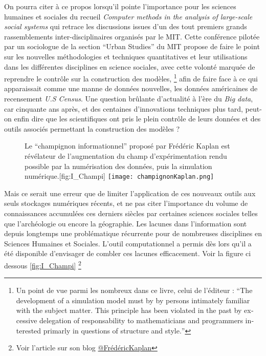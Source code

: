 On pourra citer à ce propos \textcite{Gullahorn1966} lorsqu'il pointe l'importance pour les sciences humaines et sociales du recueil \textit{Computer methods in the analysis of large-scale social systems} qui retrace les discussions issues d'un des tout premiers grands rassemblements inter-disciplinaires organisés par le MIT. Cette conférence pilotée par un sociologue de la section \foreignquote{english}{Urban Studies} du MIT \autocite{Beshers1965} propose de faire le point sur les nouvelles méthodologies et techniques quantitatives et leur utilisations dans les différentes disciplines en science sociales, avec cette volonté marquée de reprendre le contrôle sur la construction des modèles, \footnote{Un point de vue parmi les nombreux dans ce livre, celui de l'éditeur \textcite[194]{Beshers1965} : \foreignquote{english}{The development of a simulation model must by by persons intimately familiar with the subject matter. This principle has been violated in the past by excessive delegation of responsability to mathematicians and programmers interested primarly in questions of structure and style.} } afin de faire face à ce qui apparaissait comme une manne de données nouvelles, les données américaines de recensement \textit{U.S Census}. Une question brûlante d'actualité à l'ère du \textit{Big data}, car cinquante ans après, et des centaines d'innovations techniques plus tard, peut-on enfin dire que les scientifiques ont pris le plein contrôle de leurs données et des outils associés permettant la construction des modèles ?

\begin{figure}[!h]
\begin{sidecaption}[fortoc]{Le \enquote{champignon informationnel} proposé par Frédéric Kaplan est révélateur de l'augmentation du champ d'expérimentation rendu possible par la numérisation des données, puis la simulation numérique.}[fig:I_Champi]
 \centering
 \texttt{[image: champignonKaplan.png]}
  \end{sidecaption}
\end{figure}

Mais ce serait une erreur que de limiter l'application de ces nouveaux outils aux seuls stockages numériques récents, et ne pas citer l'importance du volume de connaissances accumulées ces derniers siècles par certaines sciences sociales telles que l'archéologie ou encore la géographie. Les lacunes dans l'information sont depuis longtemps une problématique récurrente pour de nombreuses disciplines en Sciences Humaines et Sociales. L'outil computationnel a permis dès lors qu'il a été disponible d'envisager de combler ces lacunes efficacement. Voir la figure ci dessous \ref{fig:I_Champi} \footnote{Voir l'article sur son blog \href{http://fkaplan.wordpress.com/2013/03/14/lancement-de-la-venice-time-machine/}{@FrédéricKaplan}}

